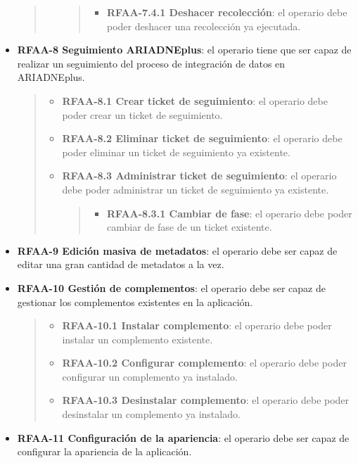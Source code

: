 \documentclass[
]{article}
\providecommand{\tightlist}{%
  \setlength{\itemsep}{0pt}\setlength{\parskip}{0pt}}
\begin{document}
\begin{itemize}
\begin{quote}
\begin{itemize}
    \begin{quote}
    \begin{itemize}
    \tightlist
    \item
      \textbf{RFAA-7.4.1 Deshacer recolección}: el operario debe poder
      deshacer una recolección ya ejecutada.
    \end{itemize}
    \end{quote}
  \end{itemize}
  \end{quote}
\item
  \textbf{RFAA-8 Seguimiento ARIADNEplus}: el operario tiene que ser
  capaz de realizar un seguimiento del proceso de integración de datos
  en ARIADNEplus.

  \begin{quote}
  \begin{itemize}
  \item
    \textbf{RFAA-8.1 Crear ticket de seguimiento}: el operario debe
    poder crear un ticket de seguimiento.
  \item
    \textbf{RFAA-8.2 Eliminar ticket de seguimiento}: el operario debe
    poder eliminar un ticket de seguimiento ya existente.
  \item
    \textbf{RFAA-8.3 Administrar ticket de seguimiento}: el operario
    debe poder administrar un ticket de seguimiento ya existente.

    \begin{quote}
    \begin{itemize}
    \tightlist
    \item
      \textbf{RFAA-8.3.1 Cambiar de fase}: el operario debe poder
      cambiar de fase de un ticket existente.
    \end{itemize}
    \end{quote}
  \end{itemize}
  \end{quote}
\item
  \textbf{RFAA-9 Edición masiva de metadatos}: el operario debe ser
  capaz de editar una gran cantidad de metadatos a la vez.
\item
  \textbf{RFAA-10 Gestión de complementos}: el operario debe ser capaz
  de gestionar los complementos existentes en la aplicación.

  \begin{quote}
  \begin{itemize}
  \tightlist
  \item
    \textbf{RFAA-10.1 Instalar complemento}: el operario debe poder
    instalar un complemento existente.
  \item
    \textbf{RFAA-10.2 Configurar complemento}: el operario debe poder
    configurar un complemento ya instalado.
  \item
    \textbf{RFAA-10.3 Desinstalar complemento}: el operario debe poder
    desinstalar un complemento ya instalado.
  \end{itemize}
  \end{quote}
\item
  \textbf{RFAA-11 Configuración de la apariencia}: el operario debe ser
  capaz de configurar la apariencia de la aplicación.


\end{itemize}
\end{document}
